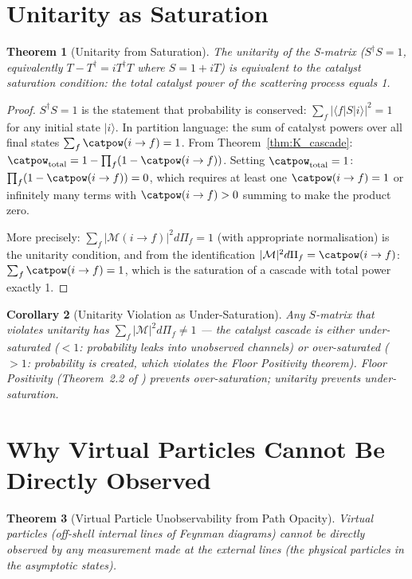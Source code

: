 \documentclass[twocolumn,10pt,a4paper]{article}
\theoremstyle{thmstyle}
\newtheorem{theorem}{Theorem}[section]
\newtheorem{corollary}[theorem]{Corollary}
\theoremstyle{definition}
\theoremstyle{remark}
\begin{document}
\section{Unitarity as Saturation}
\label{sec:unitarity}

\begin{theorem}[Unitarity from Saturation]
\label{thm:unitarity}
The unitarity of the S-matrix ($S^\dagger S = 1$, equivalently
$T - T^\dagger = iT^\dagger T$ where $S = 1 + iT$) is equivalent to
the catalyst saturation condition: the total catalyst power of the
scattering process equals 1.
\end{theorem}

\begin{proof}
$S^\dagger S = 1$ is the statement that probability is conserved:
$\sum_f|\langle f|S|i\rangle|^2 = 1$ for any initial state $|i\rangle$.
In partition language: the sum of catalyst powers over all final states
$\sum_f\catpow(i\to f) = 1$.
From Theorem~\ref{thm:K_cascade}: $\catpow_{\mathrm{total}} = 1 - \prod_f(1-\catpow(i\to f))$.
Setting $\catpow_{\mathrm{total}} = 1$: $\prod_f(1-\catpow(i\to f)) = 0$,
which requires at least one $\catpow(i\to f) = 1$ or infinitely many
terms with $\catpow(i\to f) > 0$ summing to make the product zero.

More precisely: $\sum_f|\mathcal{M}(i\to f)|^2 d\Pi_f = 1$
(with appropriate normalisation) is the unitarity condition, and from
the identification $|\mathcal{M}|^2 d\Pi_f = \catpow(i\to f)$:
$\sum_f\catpow(i\to f) = 1$, which is the saturation of a cascade
with total power exactly 1.
\end{proof}

\begin{corollary}[Unitarity Violation as Under-Saturation]
Any $S$-matrix that violates unitarity has $\sum_f|\mathcal{M}|^2 d\Pi_f \neq 1$
--- the catalyst cascade is either under-saturated ($< 1$: probability leaks
into unobserved channels) or over-saturated ($> 1$: probability is created,
which violates the Floor Positivity theorem).
Floor Positivity (Theorem~2.2 of \citealt{companion:trajectory}) prevents
over-saturation; unitarity prevents under-saturation.
\end{corollary}

\section{Why Virtual Particles Cannot Be Directly Observed}
\label{sec:unobservable}

\begin{theorem}[Virtual Particle Unobservability from Path Opacity]
\label{thm:unobservable}
Virtual particles (off-shell internal lines of Feynman diagrams) cannot
be directly observed by any measurement made at the external lines
(the physical particles in the asymptotic states).
\end{theorem}
\end{document}
